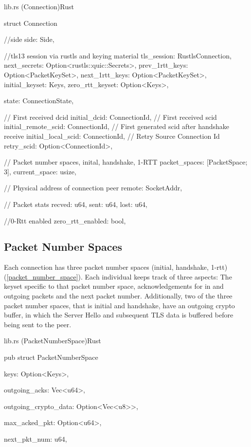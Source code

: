 \begin{codeblock}{lib.rs (Connection)}{Rust}
  \begin{rustcode}
    struct Connection {
        //side
        side: Side,
    
        //tls13 session via rustls and keying material
        tls_session: RustlsConnection,
        next_secrets: Option<rustls::quic::Secrets>,
        prev_1rtt_keys: Option<PacketKeySet>,
        next_1rtt_keys: Option<PacketKeySet>,
        initial_keyset: Keys,
        zero_rtt_keyset: Option<Keys>,
    
        state: ConnectionState,
    
        // First received dcid
        initial_dcid: ConnectionId,
        // First received scid
        initial_remote_scid: ConnectionId,
        // First generated scid after handshake receive
        initial_local_scid: ConnectionId,
        // Retry Source Connection Id
        retry_scid: Option<ConnectionId>,
    
        // Packet number spaces, inital, handshake, 1-RTT
        packet_spaces: [PacketSpace; 3],
        current_space: usize,
    
        // Physical address of connection peer
        remote: SocketAddr,
    
        // Packet stats
        recved: u64,
        sent: u64,
        lost: u64,
    
        //0-Rtt enabled
        zero_rtt_enabled: bool,
    }
  \end{rustcode}
\end{codeblock}

\subsection{Packet Number Spaces}

Each connection has three packet number spaces (initial, handshake, 1-rtt)(\ref{packet_number_space}). Each individual 
keeps track of three aspects: The keyset specific to that packet number space, acknowledgements for in and outgoing packets and the next packet
number. Additionally, two of the three packet number spaces, that is initial and handshake, have an outgoing crypto buffer, in which the Server
Hello and subsequent TLS data is buffered before being sent to the peer.

\begin{codeblock}{lib.rs (PacketNumberSpace)}{Rust}
  \begin{rustcode}
    pub struct PacketNumberSpace {
        keys: Option<Keys>,
    
        outgoing_acks: Vec<u64>,
    
        outgoing_crypto_data: Option<Vec<u8>>,
    
        max_acked_pkt: Option<u64>,
    
        next_pkt_num: u64,
    }
  \end{rustcode}
  \label{packet_number_space}
\end{codeblock}

